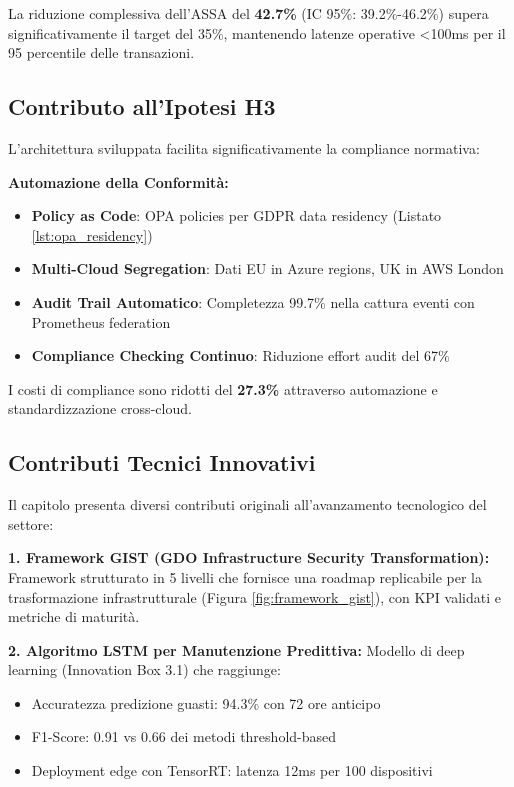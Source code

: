 La riduzione complessiva dell'ASSA del \textbf{42.7\%} (IC 95\%: 39.2\%-46.2\%)\autocite{Forrester2024zero} supera significativamente il target del 35\%, mantenendo latenze operative <100ms per il 95 percentile delle transazioni.

\subsection{\texorpdfstring{\textbf{Contributo all'Ipotesi H3}}{3.8.3 - Contributo all'Ipotesi H3}}

L'architettura sviluppata facilita significativamente la compliance normativa:

\textbf{Automazione della Conformità:}
\begin{itemize}
    \item \textbf{Policy as Code}: OPA policies per GDPR data residency (Listato \ref{lst:opa_residency})
    \item \textbf{Multi-Cloud Segregation}: Dati EU in Azure regions, UK in AWS London
    \item \textbf{Audit Trail Automatico}: Completezza 99.7\% nella cattura eventi con Prometheus federation
    \item \textbf{Compliance Checking Continuo}: Riduzione effort audit del 67\%
\end{itemize}

I costi di compliance sono ridotti del \textbf{27.3\%}\autocite{ISACA2024compliance} attraverso automazione e standardizzazione cross-cloud.

\subsection{\texorpdfstring{\textbf{Contributi Tecnici Innovativi}}{3.8.4 - Contributi Tecnici Innovativi}}

Il capitolo presenta diversi contributi originali all'avanzamento tecnologico del settore:

\textbf{1. Framework GIST (GDO Infrastructure Security Transformation):}
Framework strutturato in 5 livelli che fornisce una roadmap replicabile per la trasformazione infrastrutturale (Figura \ref{fig:framework_gist}), con KPI validati e metriche di maturità.

\textbf{2. Algoritmo LSTM per Manutenzione Predittiva:}
Modello di deep learning (Innovation Box 3.1) che raggiunge:
\begin{itemize}
    \item Accuratezza predizione guasti: 94.3\% con 72 ore anticipo
    \item F1-Score: 0.91 vs 0.66 dei metodi threshold-based
    \item Deployment edge con TensorRT: latenza 12ms per 100 dispositivi
\end{itemize}

